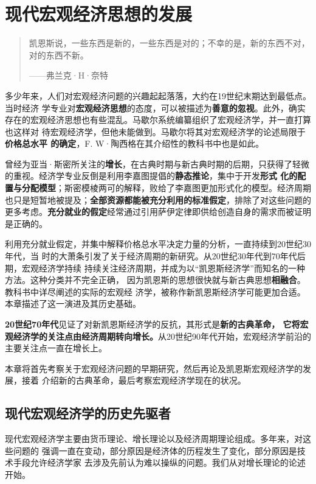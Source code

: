 \chapter{现代宏观经济思想的发展}

\begin{quotation}
  凯恩斯说，一些东西是新的，一些东西是对的；不幸的是，新的东西不对，对的东西不新。

  \raggedleft ——弗兰克·H·奈特
\end{quotation}

多少年来，人们对宏观经济问题的兴趣起起落落，大约在19世纪末期达到最低点。当时经济
学专业对\textbf{宏观经济思想}的态度，可以被描述为\textbf{善意的忽视}。此外，确实
存在的宏观经济思想也有些混乱。马歇尔系统编纂组织了宏观经济学，并一直打算也这样对
待宏观经济学，但他未能做到。马歇尔将其对宏观经济学的论述局限于\textbf{价格总水平
  的确定}，F. W·陶西格在其介绍性的教科书中也是如此。

曾经为亚当·斯密所关注的\textbf{增长}，在古典时期与新古典时期的后期，只获得了轻微
的重视。经济学专业反倒是利用李嘉图提倡的\textbf{静态推论}，集中于开发\textbf{形式
  化的配置与分配模型}；斯密模棱两可的解释，败给了李嘉图更加形式化的模型。经济周期
也只是短暂地被提及；\textbf{全部资源都能被充分利用的标准假定}，排除了对这些问题的
更多考虑。\textbf{充分就业的假定}经常通过引用萨伊定律即供给创造自身的需求而被证明
是正确的。

利用充分就业假定，并集中解释价格总水平决定力量的分析，一直持续到20世纪30年代，当
时的大萧条引发了关于经济周期的新研究。从20世纪30年代到70年代后期，宏观经济学持续
持续关注经济周期，并成为以“凯恩斯经济学”而知名的一种方法。这种分类并不完全正确，
因为凯恩斯的思想很快就与新古典思想\textbf{相融合}。教科书中详尽阐述的实际的宏观经
济学，被称作新凯恩斯经济学可能更加合适。本章描述了这一演进及其历史基础。

\textbf{20世纪70年代}见证了对新凯恩斯经济学的反抗，其形式是\textbf{新的古典革命，
  它将宏观经济学的关注点由经济周期转向增长。}从20世纪90年代开始，宏观经济学前沿的
主要关注点一直在增长上。

本章将首先考察关于宏观经济问题的早期研究，然后再论及凯恩斯宏观经济学的发展，接着
介绍新的古典革命，最后考察宏观经济学现在的状况。

\section{现代宏观经济学的历史先驱者}

现代宏观经济学主要由货币理论、增长理论以及经济周期理论组成。多年来，对这些问题的
强调一直在变动，部分原因是经济体的历程发生了变化，部分原因是技术手段允许经济学家
去涉及先前认为难以操纵的问题。我们从对增长理论的论述开始。

